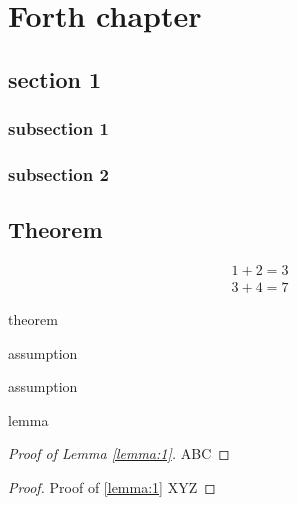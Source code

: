 \chapter{Forth chapter}
\label{ch:ch4}

\section{section 1}\label{sec:ch4/sec1}
	\subsection{subsection 1}\label{subsec:ch4/sec1/sub1}
	\subsection{subsection 2}\label{subsec:ch4/sec1/sub2}
\section{}\label{sec:ch4/sect2}

\section{Theorem} \label{sec:ch4/sect3}

\begin{align} \label{eq:sec1}
	1+2=3	\\
	3+4=7
\end{align}

\begin{theorem}
	theorem
\end{theorem}

\begin{assumption}
	assumption
\end{assumption}

\begin{assumption}
	assumption
\end{assumption}

\begin{lemma}
	\label{lemma:1}
	lemma
\end{lemma}

\begin{proof}[Proof of Lemma \ref{lemma:1}]
	ABC 
\end{proof}
\begin{proof} Proof of \cref{lemma:1}
	XYZ
\end{proof}

